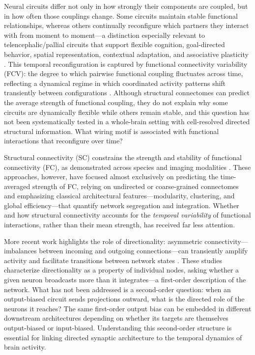 \documentclass[9pt,twocolumn,twoside]{pnas-new}
\begin{document}
Neural circuits differ not only in how strongly their components are coupled, but in how often those couplings change. Some circuits maintain stable functional relationships, whereas others continually reconfigure which partners they interact with from moment to moment---a distinction especially relevant to telencephalic/pallial circuits that support flexible cognition, goal-directed behavior, spatial representation, contextual adaptation, and associative plasticity \citep{miller2001integrative,duncan2001adaptive,sakai2006prefrontal,cole2013multi,braun2015dynamic,Yang2024SpatialCode,Dempsey2022ZebrafishMemorySynapses}. This temporal reconfiguration is captured by functional connectivity variability (FCV): the degree to which pairwise functional coupling fluctuates across time, reflecting a dynamical regime in which coordinated activity patterns shift transiently between configurations \citep{werner2007metastability,deco2017hierarchy,tognoli2014metastable}. Although structural connectomes can predict the average strength of functional coupling, they do not explain why some circuits are dynamically flexible while others remain stable, and this question has not been systematically tested in a whole-brain setting with cell-resolved directed structural information. What wiring motif is associated with functional interactions that reconfigure over time?

Structural connectivity (SC) constrains the strength and stability of functional connectivity (FC), as demonstrated across species and imaging modalities \citep{honey2009predicting,honey2010can,goni2014resting,deco2011emerging,rosch2024spontaneous}. These approaches, however, have focused almost exclusively on predicting the time-averaged strength of FC, relying on undirected or coarse-grained connectomes and emphasizing classical architectural features---modularity, clustering, and global efficiency---that quantify network segregation and integration. Whether and how structural connectivity accounts for the \emph{temporal variability} of functional interactions, rather than their mean strength, has received far less attention. \Endparasplit

More recent work highlights the role of directionality: asymmetric connectivity---imbalances between incoming and outgoing connections---can transiently amplify activity and facilitate transitions between network states \citep{battaglia2012dynamic,dahmen2025heterogeneity,murphy2009balanced,goldman2009memory,hennequin2014optimal}. These studies characterize directionality as a property of individual nodes, asking whether a given neuron broadcasts more than it integrates---a first-order description of the network. What has not been addressed is a second-order question: when an output-biased circuit sends projections outward, what is the directed role of the neurons it reaches? The same first-order output bias can be embedded in different downstream architectures depending on whether its targets are themselves output-biased or input-biased. Understanding this second-order structure is essential for linking directed synaptic architecture to the temporal dynamics of brain activity.
\end{document}
